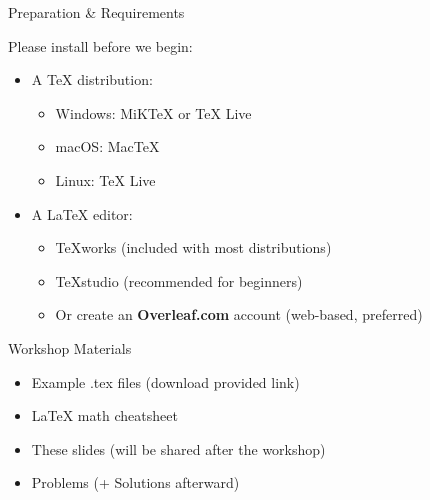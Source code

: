 \begin{frame}{Preparation \& Requirements}
	\begin{block}{Please install before we begin:}
		\begin{itemize}
			\item A TeX distribution:
			\begin{itemize}
				\item Windows: MiKTeX or TeX Live
				\item macOS: MacTeX
				\item Linux: TeX Live
			\end{itemize}
			\item A LaTeX editor:
			\begin{itemize}
				\item TeXworks (included with most distributions)
				\item TeXstudio (recommended for beginners)
				\item Or create an \textbf{Overleaf.com} account (web-based, preferred)
			\end{itemize}
		\end{itemize}
	\end{block}
	
	\begin{alertblock}{Workshop Materials}
		\begin{itemize}
			\item Example .tex files (download provided link)
			\item LaTeX math cheatsheet
			\item These slides (will be shared after the workshop)
			\item Problems (+ Solutions afterward)
		\end{itemize}
	\end{alertblock}
\end{frame}